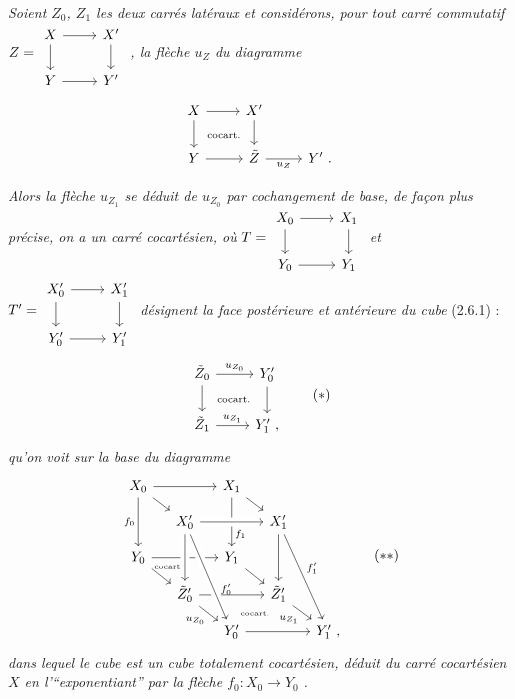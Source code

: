\documentclass[11pt]{article}
\newcommand{\printedpage}[1]{\marginpar{\footnotesize p.~#1}}
\newcommand{\msp}[1]{\marginpar{\footnotesize [#1]}}
\begin{document}
\textit{Soient $Z_0$, $Z_1$ les deux carrés latéraux et considérons, pour tout carré commutatif}
$Z = \begin{tikzcd}[ampersand replacement=\&, baseline=(\tikzcdmatrixname.center)]
X \arrow[r] \arrow[d] \& X' \arrow[d] \\
Y \arrow[r] \& Y'
\end{tikzcd}$ \textit{, la flèche $u_Z$ du diagramme}
\[
\begin{tikzcd}
X \arrow[r] \arrow[d] \arrow[dr, phantom, "\text{\scriptsize cocart.}"] & X' \arrow[d] & \\
Y \arrow[r] & \tilde{Z} \arrow[r, "u_Z"'] & Y' \ .
\end{tikzcd}
\]

\printedpage{18}

\msp{page 32}

\textit{Alors la flèche $u_{Z_1}$ se déduit de $u_{Z_0}$ par cochangement de base, de façon plus précise, on a un carré cocartésien, où} $T = \begin{tikzcd}[ampersand replacement=\&, baseline=(\tikzcdmatrixname.center)]
X_0 \arrow[r] \arrow[d] \& X_1 \arrow[d] \\
Y_0 \arrow[r] \& Y_1
\end{tikzcd}$ \textit{et} $T' = \begin{tikzcd}[ampersand replacement=\&, baseline=(\tikzcdmatrixname.center)]
X'_0 \arrow[r] \arrow[d] \& X'_1 \arrow[d] \\
Y'_0 \arrow[r] \& Y'_1
\end{tikzcd}$ \textit{désignent la face postérieure et antérieure du cube} \textup{(2.6.1) :}
\[
\begin{tikzcd}
\tilde{Z}_0 \arrow[r, "u_{Z_0}"] \arrow[d] \arrow[dr, phantom, "\text{\scriptsize cocart.}"] & Y'_0 \arrow[d] \\
\tilde{Z}_1 \arrow[r, "u_{Z_1}"] & Y'_1 \ ,
\end{tikzcd}
\tag*{$(*)$}
\]
\textit{qu'on voit sur la base du diagramme}
\[
\begin{tikzcd}[row sep=small, column sep=small]
X_0 \arrow[rr] \arrow[dr] \arrow[dd, "f_0"'] & & X_1 \arrow[dr] \arrow[dd, "f_1" near end] & & \\
 & X'_0 \arrow[rr, crossing over] & & X'_1 \arrow[dd] \arrow[dddr, "f'_1"] & \\
Y_0 \arrow[rr] \arrow[dr] \arrow[dr, phantom, shift left=2ex, "\text{\tiny cocart.}"] & & Y_1 \arrow[dr] & & \\
 & \tilde{Z}'_0 \arrow[rr] \arrow[dr, "u_{Z_0}"'] \arrow[from=uu, crossing over] & & \tilde{Z}'_1 \arrow[dr, "u_{Z_1}"'] & \\
 & & Y'_0 \arrow[rr] \arrow[from=uuul, crossing over, "f'_0" near end] \arrow[ur, phantom, "\text{\tiny cocart.}"] & & Y'_1 \ ,
\end{tikzcd} %
\tag*{$(**)$}
\]
\textit{dans lequel le cube est un cube totalement cocartésien, déduit du carré cocartésien $X$ en l'“exponentiant” par la flèche $f_0 : X_0 \longrightarrow Y_0$} \textit{.}
\end{document}

